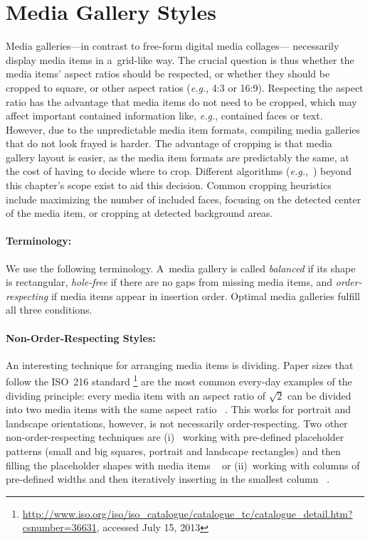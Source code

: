 \section{Media Gallery Styles}
\label{sec:mediagallerystyles}

Media galleries---in contrast to free-form digital media collages---%
necessarily display media items in a~grid-like way.
The crucial question is thus whether the media items' aspect ratios
should be respected, or whether they should be cropped to square,
or other aspect ratios (\emph{e.g.}, 4:3 or 16:9).
Respecting the aspect ratio has the advantage that media items
do not need to be cropped, which may affect important contained information like, \emph{e.g.},
contained faces or text.
However, due to the unpredictable media item formats,
compiling media galleries that do not look frayed is harder.
The advantage of cropping is that media gallery layout is easier,
as the media item formats are predictably the same,
at the cost of having to decide where to crop.
Different algorithms (\emph{e.g.},~\cite{suh2003thumbnail})
beyond this chapter's scope exist to aid this decision.
Common cropping heuristics include
maximizing the number of included faces,
focusing on the detected center of the media item,
or cropping at detected background areas.


\paragraph{Terminology:}

We use the following terminology.
A~media gallery is called \emph{balanced} if its shape is rectangular,
\emph{hole-free} if there are no gaps from missing media items,
and \emph{order-respecting}
if media items appear in insertion order.
Optimal media galleries fulfill all three conditions.

\paragraph{Non-Order-Respecting Styles:}

An interesting technique for arranging media items is dividing.
Paper sizes that follow the ISO~216 standard%
\footnote{\url{http://www.iso.org/iso/iso_catalogue/catalogue_tc/catalogue_detail.htm?csnumber=36631},
accessed July 15, 2013}
are the most common every-day examples of the dividing principle:
every media item with an aspect ratio of $ \sqrt2 $ can be divided
into two media items with the same aspect ratio%
~\cite{chedeau2012lightboxandroid}.
This works for portrait and landscape orientations,
however, is not necessarily order-respecting.
Two other non-order-respecting techniques are (i)~%
working with pre-defined placeholder patterns
(small and big squares, portrait and landscape rectangles)
and then filling the placeholder shapes with media items%
~\cite{chedeau2012500px}
or (ii)~working with columns of pre-defined widths
and then iteratively inserting in the smallest column%
~\cite{chedeau2012lightbox}.

